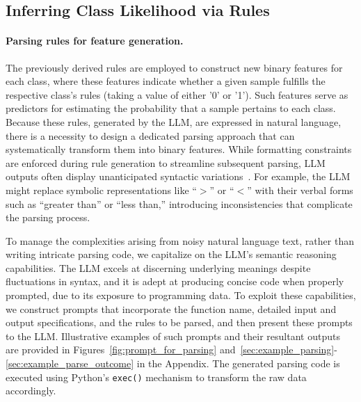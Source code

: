 \subsection{Inferring Class Likelihood via Rules}
\label{Sec:training}

\paragraph{Parsing rules for feature generation.} The previously derived rules are employed to construct new binary features for each class, where these features indicate whether a given sample fulfills the respective class's rules (taking a value of either '0' or '1'). Such features serve as predictors for estimating the probability that a sample pertains to each class. Because these rules, generated by the LLM, are expressed in natural language, there is a necessity to design a dedicated parsing approach that can systematically transform them into binary features. While formatting constraints are enforced during rule generation to streamline subsequent parsing, LLM outputs often display unanticipated syntactic variations~\cite{kovavc2023large}. For example, the LLM might replace symbolic representations like ``$>$'' or ``$<$'' with their verbal forms such as ``greater than'' or ``less than,'' introducing inconsistencies that complicate the parsing process.

To manage the complexities arising from noisy natural language text, rather than writing intricate parsing code, we capitalize on the LLM's semantic reasoning capabilities. The LLM excels at discerning underlying meanings despite fluctuations in syntax, and it is adept at producing concise code when properly prompted, due to its exposure to programming data. To exploit these capabilities, we construct prompts that incorporate the function name, detailed input and output specifications, and the rules to be parsed, and then present these prompts to the LLM. Illustrative examples of such prompts and their resultant outputs are provided in Figures~\ref{fig:prompt_for_parsing} and~\ref{sec:example_parsing}-\ref{sec:example_parse_outcome} in the Appendix. The generated parsing code is executed using Python's \texttt{exec()} mechanism to transform the raw data accordingly.

\vspace*{-0.12in}
